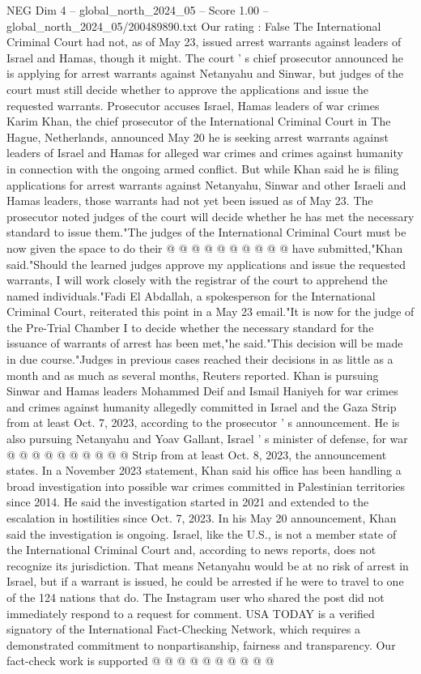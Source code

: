 \begin{textsample}{NEG Dim 4 – global\_north\_2024\_05 – Score 1.00 – global\_north\_2024\_05/200489890.txt}  \label{ex:f4_neg_122}
Our rating : False The International Criminal Court had not, as of May 23, issued arrest warrants against leaders of Israel and Hamas, though it might.
The court ' s chief prosecutor announced he is applying for arrest warrants against Netanyahu and Sinwar, but judges of the court must still decide whether to approve the applications and issue the requested warrants.
Prosecutor accuses Israel, Hamas leaders of war crimes Karim Khan, the chief prosecutor of the International Criminal Court in The Hague, Netherlands, announced May 20 he is seeking arrest warrants against leaders of Israel and Hamas for alleged war crimes and crimes against humanity in connection with the ongoing armed conflict.
But while Khan said he is filing applications for arrest warrants against Netanyahu, Sinwar and other Israeli and Hamas leaders, those warrants had not yet been issued as of May 23.
The prosecutor noted judges of the court will decide whether he has met the necessary standard to issue them."The judges of the International Criminal Court must be now given the space to do their @ @ @ @ @ @ @ @ @ @ have submitted,"Khan said."Should the learned judges approve my applications and issue the requested warrants, I will work closely with the registrar of the court to apprehend the named individuals."Fadi El Abdallah, a spokesperson for the International Criminal Court, reiterated this point in a May 23 email."It is now for the judge of the Pre-Trial Chamber I to decide whether the necessary standard for the issuance of warrants of arrest has been met,"he said."This decision will be made in due course."Judges in previous cases reached their decisions in as little as a month and as much as several months, Reuters reported.
Khan is pursuing Sinwar and Hamas leaders Mohammed Deif and Ismail Haniyeh for war crimes and crimes against humanity allegedly committed in Israel and the Gaza Strip from at least Oct. 7, 2023, according to the prosecutor ' s announcement.
He is also pursuing Netanyahu and Yoav Gallant, Israel ' s minister of defense, for war @ @ @ @ @ @ @ @ @ @ Strip from at least Oct. 8, 2023, the announcement states.
In a November 2023 statement, Khan said his office has been handling a broad investigation into possible war crimes committed in Palestinian territories since 2014.
He said the investigation started in 2021 and extended to the escalation in hostilities since Oct. 7, 2023.
In his May 20 announcement, Khan said the investigation is ongoing.
Israel, like the U.S., is not a member state of the International Criminal Court and, according to news reports, does not recognize its jurisdiction.
That means Netanyahu would be at no risk of arrest in Israel, but if a warrant is issued, he could be arrested if he were to travel to one of the 124 nations that do.
The Instagram user who shared the post did not immediately respond to a request for comment.
USA TODAY is a verified signatory of the International Fact-Checking Network, which requires a demonstrated commitment to nonpartisanship, fairness and transparency.
Our fact-check work is supported @ @ @ @ @ @ @ @ @ @

\end{textsample}
